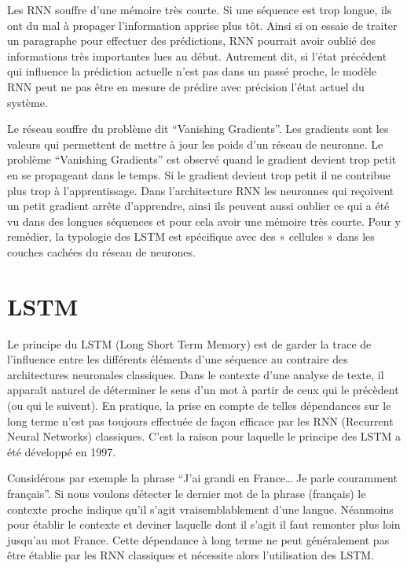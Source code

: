 \documentclass[8pt]{article}
\begin{document}
    Les RNN souffre d'une mémoire très courte. Si une séquence est trop
longue, ils ont du mal à propager l'information apprise plus tôt. Ainsi
si on essaie de traiter un paragraphe pour effectuer des prédictions,
RNN pourrait avoir oublié des informations très importantes lues au
début. Autrement dit, si l'état précédent qui influence la prédiction
actuelle n'est pas dans un passé proche, le modèle RNN peut ne pas être
en mesure de prédire avec précision l'état actuel du système.

Le réseau souffre du problème dit ``Vanishing Gradients''. Les gradients
sont les valeurs qui permettent de mettre à jour les poids d'un réseau
de neuronne. Le problème ``Vanishing Gradients'' est observé quand le
gradient devient trop petit en se propageant dans le temps. Si le
gradient devient trop petit il ne contribue plus trop à l'apprentissage.
Dans l'architecture RNN les neuronnes qui reçoivent un petit gradient
arrête d'apprendre, ainsi ils peuvent aussi oublier ce qui a été vu dans
des longues séquences et pour cela avoir une mémoire très courte. Pour y
remédier, la typologie des LSTM est spécifique avec des « cellules »
dans les couches cachées du réseau de neurones.

    \hypertarget{lstm}{%
\section{LSTM}\label{lstm}}

    Le principe du LSTM (Long Short Term Memory) est de garder la trace de
l'influence entre les différents éléments d'une séquence au contraire
des architectures neuronales classiques. Dans le contexte d'une analyse
de texte, il apparaît naturel de déterminer le sens d'un mot à partir de
ceux qui le précèdent (ou qui le suivent). En pratique, la prise en
compte de telles dépendances sur le long terme n'est pas toujours
effectuée de façon efficace par les RNN (Recurrent Neural Networks)
classiques. C'est la raison pour laquelle le principe des LSTM a été
développé en 1997.

Considérons par exemple la phrase ``J'ai grandi en France\ldots{} Je
parle couramment français''. Si nous voulons détecter le dernier mot de
la phrase (français) le contexte proche indique qu'il s'agit
vraisemblablement d'une langue. Néanmoins pour établir le contexte et
deviner laquelle dont il s'agit il faut remonter plus loin jusqu'au mot
France. Cette dépendance à long terme ne peut généralement pas être
établie par les RNN classiques et nécessite alors l'utilisation des
LSTM.
\end{document}

